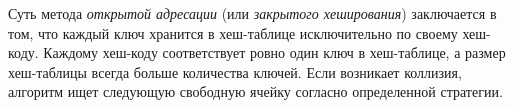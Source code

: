 Суть метода \textit{открытой адресации} (или \textit{закрытого хеширования}) заключается в том, что каждый ключ хранится в хеш-таблице исключительно по своему хеш-коду. Каждому хеш-коду соответствует ровно один ключ в хеш-таблице, а размер хеш-таблицы всегда больше количества ключей. Если возникает коллизия, алгоритм ищет следующую свободную ячейку согласно определенной стратегии.
\vspace{5pt}

